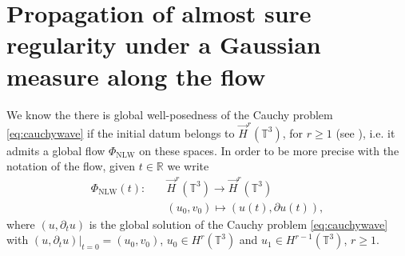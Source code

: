 \documentclass[a4paper, reqno, 11pt]{amsart}
\theoremstyle{definition}
\begin{document}
                                                                                                                                                                                                                                                                                                                                                                                                                                                                                                                                                                                                                                                                                                                                                                                                                                                                                                                                                                                                                                                                                                                                                                                                                                                                                                                                                                                                                                                                                   \section{Propagation of almost sure regularity under a Gaussian measure along the flow} \label{sec:prob}
We know the there is global well-posedness of the Cauchy problem \eqref{eq:cauchywave} if the initial datum belongs to $\vec{H}^r(\mathbb{T}^3)$, for $r \geq 1$ (see \cite{Tzvetkov2019-notes}), i.e. it admits a global flow $\Phi_{\text{NLW}}$ on these spaces. In order to be more precise with the notation of the flow, given $t \in \mathbb{R}$ we write
\begin{align*}
\Phi_{\text{NLW}}(t) :& \quad \vec{H}^r(\mathbb{T}^3) \rightarrow \vec{H}^r(\mathbb{T}^3) \\
&\quad (u_0 , v_0) \mapsto (u(t),\partial u(t)),
\end{align*}
where $(u,\partial_t u)$ is the global solution of the Cauchy problem \eqref{eq:cauchywave} with $\left. (u,\partial_t u)\right|_{t=0} = (u_0,v_0)$, $u_0 \in H^r(\mathbb{T}^3)$ and $u_1 \in H^{r-1}(\mathbb{T}^3)$, $r \geq 1$.
\end{document}
